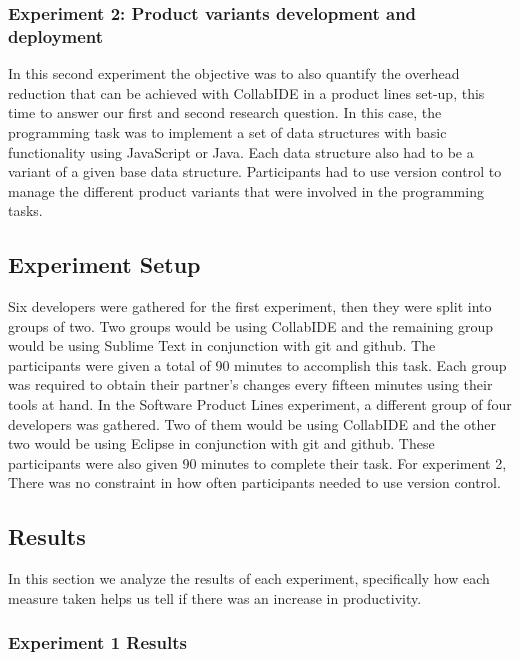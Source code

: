 \subsubsection{Experiment 2: Product variants development and deployment}
In this second experiment the objective was to also quantify the overhead reduction that can be achieved with CollabIDE in a product lines set-up, this time to answer our first and second research question. In this case, the programming task was to implement a set of data structures with basic functionality using JavaScript  or Java. Each data structure also had to be a variant of a given base data structure. Participants had to use version control to manage the different product variants that were involved in the programming tasks.

\subsection{Experiment Setup}

Six developers were gathered for the first experiment, then they were split into groups of two. Two groups would be using CollabIDE and the remaining group would be using Sublime Text in conjunction with git and github. The participants were given a total of 90 minutes to accomplish this task. Each group was required to obtain their partner’s changes every fifteen minutes using their tools at hand. In the Software Product Lines experiment, a different group of four developers was gathered. Two of them would be using CollabIDE and the other two would be using Eclipse in conjunction with git and github. These participants were also given 90 minutes to complete their task. For experiment 2, There was no constraint in how often participants needed to use version control.


	

\subsection{Results}

In this section we analyze the results of each experiment, specifically how each measure taken helps us tell if there was an increase in productivity.

\subsubsection{Experiment 1 Results}


